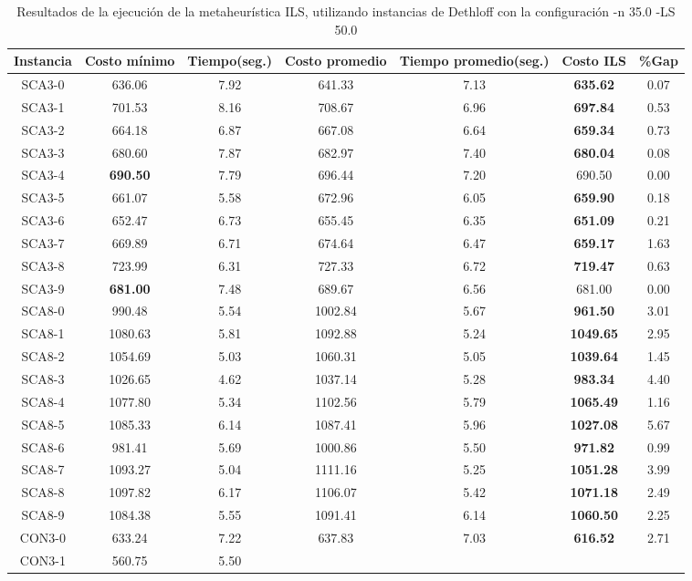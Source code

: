\begin{table}[ht]
\caption{Resultados de la ejecución de la metaheurística ILS, utilizando instancias de Dethloff con la configuración -n 35.0 -LS 50.0}
\centering
\small
\begin{tabular}{c c c c c c c}
\hline\hline
Instancia & Costo mínimo & Tiempo(seg.) & Costo promedio & Tiempo promedio(seg.) & Costo ILS & \%Gap \\ [0.5ex]
\hline
SCA3-0 & 636.06 & 7.92 & 
641.33 & 7.13 & \bf{635.62} & 
0.07\\SCA3-1 & 701.53 & 8.16 & 
708.67 & 6.96 & \bf{697.84} & 
0.53\\SCA3-2 & 664.18 & 6.87 & 
667.08 & 6.64 & \bf{659.34} & 
0.73\\SCA3-3 & 680.60 & 7.87 & 
682.97 & 7.40 & \bf{680.04} & 
0.08\\SCA3-4 & \bf{690.50} & 7.79 & 
696.44 & 7.20 & 690.50 & 0.00\\
SCA3-5 & 661.07 & 5.58 & 
672.96 & 6.05 & \bf{659.90} & 
0.18\\SCA3-6 & 652.47 & 6.73 & 
655.45 & 6.35 & \bf{651.09} & 
0.21\\SCA3-7 & 669.89 & 6.71 & 
674.64 & 6.47 & \bf{659.17} & 
1.63\\SCA3-8 & 723.99 & 6.31 & 
727.33 & 6.72 & \bf{719.47} & 
0.63\\SCA3-9 & \bf{681.00} & 7.48 & 
689.67 & 6.56 & 681.00 & 0.00\\
SCA8-0 & 990.48 & 5.54 & 
1002.84 & 5.67 & \bf{961.50} & 
3.01\\SCA8-1 & 1080.63 & 5.81 & 
1092.88 & 5.24 & \bf{1049.65} & 
2.95\\SCA8-2 & 1054.69 & 5.03 & 
1060.31 & 5.05 & \bf{1039.64} & 
1.45\\SCA8-3 & 1026.65 & 4.62 & 
1037.14 & 5.28 & \bf{983.34} & 
4.40\\SCA8-4 & 1077.80 & 5.34 & 
1102.56 & 5.79 & \bf{1065.49} & 
1.16\\SCA8-5 & 1085.33 & 6.14 & 
1087.41 & 5.96 & \bf{1027.08} & 
5.67\\SCA8-6 & 981.41 & 5.69 & 
1000.86 & 5.50 & \bf{971.82} & 
0.99\\SCA8-7 & 1093.27 & 5.04 & 
1111.16 & 5.25 & \bf{1051.28} & 
3.99\\SCA8-8 & 1097.82 & 6.17 & 
1106.07 & 5.42 & \bf{1071.18} & 
2.49\\SCA8-9 & 1084.38 & 5.55 & 
1091.41 & 6.14 & \bf{1060.50} & 
2.25\\CON3-0 & 633.24 & 7.22 & 
637.83 & 7.03 & \bf{616.52} & 
2.71\\CON3-1 & 560.75 & 5.50 & 

\end{tabular}
\end{table}
